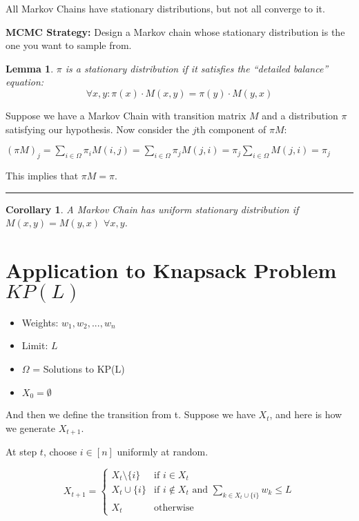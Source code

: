 \documentclass[twoside]{article}
\newtheorem{lemma}[theorem]{Lemma}
\newtheorem{corollary}[theorem]{Corollary}
\newenvironment{proof}{{\bf Proof:}}{\hfill\rule{2mm}{2mm}}
\begin{document}
All Markov Chains have stationary distributions, but not all converge to it.

\textbf{MCMC Strategy:}  Design a Markov chain whose stationary distribution is the one you want to sample from.

\begin{lemma}
   $\pi$ is a stationary distribution if it satisfies the ``detailed balance'' equation:
   $$
   \forall x,y: \pi(x) \cdot M(x, y) = \pi(y) \cdot M(y, x)
   $$
\end{lemma}

\begin{proof}
Suppose we have a Markov Chain with transition matrix $M$ and a distribution $\pi$ satisfying our hypothesis. Now consider the $j$th component of $\pi M$:

$(\pi M)_j = \sum_{i \in \Omega} \pi_i M(i,j) = \sum_{i \in \Omega} \pi_j M(j, i) = \pi_j \sum_{i \in \Omega} M(j, i) = \pi_j$

This implies that $\pi M = \pi$.
\end{proof}

\begin{corollary}
\label{knapsack}
   A Markov Chain has uniform stationary distribution if $M(x, y) = M(y, x)$ $\forall x, y$.
\end{corollary}






\section{Application to Knapsack Problem $KP(L)$}

\begin{itemize}
   \item Weights: $w_1,w_2, ..., w_n$
   \item Limit: $L$
   \item $\Omega$ = Solutions to KP(L)
   \item $X_0 = \emptyset$
\end{itemize}

And then we define the transition from t. Suppose we have $X_t$, and here is how we generate $X_{t+1}$.  

At step $t$, choose $i \in [n]$ uniformly at random.

$$
X_{t+1} = \begin{cases}
   X_t \setminus \{i\} & \text{if } i \in X_t \\
   X_t \cup \{i\} & \text{if } i \notin X_t \text{ and } \sum_{k \in X_t \cup \{i\}} w_k \leq L\\
   X_t & \text{otherwise}
\end{cases}
$$
\end{document}
